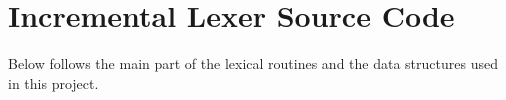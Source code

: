 \chapter{Incremental Lexer Source Code}\label{chap:code}
Below follows the main part of the lexical routines and the data structures used in this project.

